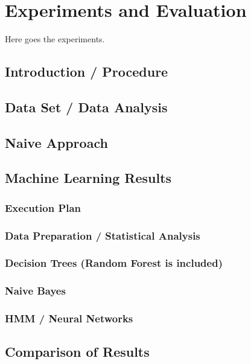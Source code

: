 \section{Experiments and Evaluation}

Here goes the experiments.


\subsection{Introduction / Procedure}

\subsection{Data Set / Data Analysis}

\subsection{Naive Approach}


\subsection{Machine Learning Results}

\subsubsection{Execution Plan}
\subsubsection{Data Preparation / Statistical Analysis}
\subsubsection{Decision Trees (Random Forest is included)}
\subsubsection{Naive Bayes}
\subsubsection{HMM / Neural Networks}

\subsection{Comparison of Results}